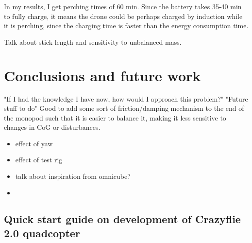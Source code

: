 \documentclass[12pt,a4paper]{article}
\begin{document}
In my results, I get perching times of 60 min. Since the battery takes 35-40 min to fully charge, it means the drone could be perhaps charged by induction while it is perching, since the charging time is faster than the energy consumption time.

Talk about stick length and sensitivity to unbalanced mass.
\section{Conclusions and future work}
"If I had the knowledge I have now, how would I approach this problem?"
"Future stuff to do"
Good to add some sort of friction/damping mechanism to the end of the monopod such that it is easier to balance it, making it less sensitive to changes in CoG or disturbances.
\begin{itemize}

\item effect of yaw
\item effect of test rig
\item talk about inspiration from omnicube?
\item   \end{itemize}





\pagebreak
\begin{appendices}
\section{Quick start guide on development of Crazyflie 2.0 quadcopter}

\end{appendices}
\end{document}
